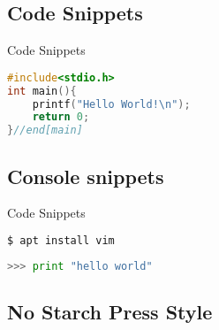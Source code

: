\documentclass[gruvbox,Frankfurt,12pt]{darkbeamer}
\begin{document}
\subsection{Code Snippets}

\begin{frame}[fragile]{Code Snippets}
\begin{lstlisting}[language=c, caption=C snippet]
#include<stdio.h>
int main(){
	printf("Hello World!\n");
	return 0;
}//end[main]
\end{lstlisting}
\end{frame}

\subsection{Console snippets}

\begin{frame}[fragile]{Code Snippets}
\begin{lstlisting}[language=bash, caption=Debian snippet]
$ apt install vim 
\end{lstlisting}

\begin{lstlisting}[language=python, caption=Python snippet]
>>> print "hello world"
\end{lstlisting}
\end{frame}

\subsection{No Starch Press Style}
\end{document}
